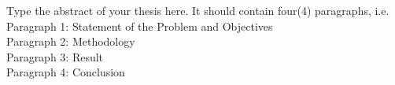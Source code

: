 Type the abstract of your thesis here. It should contain four(4) paragraphs, i.e.\\
Paragraph 1: Statement of the Problem and Objectives\\
Paragraph 2: Methodology\\
Paragraph 3: Result\\
Paragraph 4: Conclusion\\

